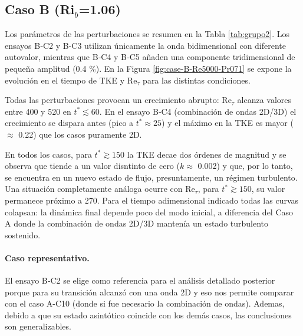 \subsection{Caso B (Ri$_b$=1.06)}

Los parámetros de las perturbaciones se resumen en la Tabla \ref{tab:grupo2}. Los ensayos B‑C2 y B‑C3 utilizan únicamente la onda bidimensional con diferente autovalor, mientras que B‑C4 y B‑C5 añaden una componente tridimensional de pequeña amplitud (0.4 \%). En la Figura \ref{fig:case-B-Re5000-Pr071} se expone la evolución en el tiempo de TKE y Re$_{\tau}$ para las distintas condiciones.  

Todas las perturbaciones provocan un crecimiento abrupto: Re$_{\tau}$ alcanza valores entre 400 y 520 en $t^*\lesssim 60$. En el ensayo B‑C4 (combinación de ondas 2D/3D) el crecimiento se dispara antes (pico a $t^*\approx 25$) y el máximo en la TKE es mayor ($\approx$ 0.22) que los casos puramente 2D.

En todos los casos, para $t^* \gtrsim 150$ la TKE decae dos órdenes de magnitud y se observa que tiende a un valor disntinto de cero ($k \approx$ 0.002) y que, por lo tanto, se encuentra en un nuevo estado de flujo, presuntamente, un régimen turbulento. Una situación completamente análoga ocurre con Re$_{\tau}$, para $t^* \gtrsim 150$, su valor permanece próximo a 270. Para el tiempo adimensional indicado todas las curvas colapsan: la dinámica final depende poco del modo inicial, a diferencia del Caso A donde la combinación de ondas 2D/3D mantenía un estado turbulento sostenido.

\paragraph{Caso representativo.} El ensayo B‑C2 se elige como referencia para el análisis detallado posterior porque para su transición alcanzó con una onda 2D y eso nos permite comparar con el caso A-C10 (donde si fue necesario la combinación de ondas). Ademas, debido a que su estado asintótico coincide con los demás casos, las conclusiones son generalizables.


\begin{table}[H]
\centering
\caption{Parámetros de las condiciones iniciales para el caso B (Re$_o$ = 5000, Pr = 0.71, Ri$_b$ = 1.06).}
\label{tab:grupo2}
\end{table}

